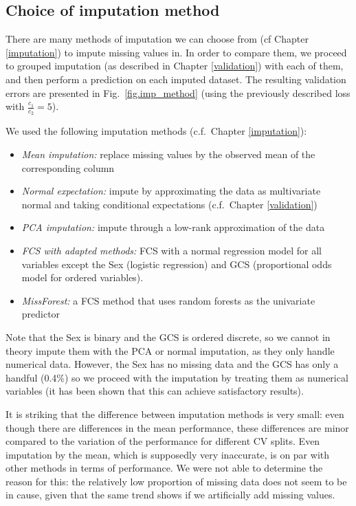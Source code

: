 		\subsection{Choice of imputation method}
		\label{choice.imp}
There are many methods of imputation we can choose from (cf Chapter \ref{imputation}) to impute missing values in. In order to compare them, we proceed to grouped imputation (as described in Chapter \ref{validation}) with each of them, and then perform a prediction on each imputed dataset. The resulting validation errors are presented in Fig.\ \ref{fig.imp_method} (using the previously described loss with $\frac{c_1}{c_2}=5$).

We used the following imputation methods (c.f.\ Chapter \ref{imputation}):
\begin{itemize}
\item \emph{Mean imputation:} replace missing values by the observed mean of the corresponding column
\item \emph{Normal expectation:} impute by approximating the data as multivariate normal and taking conditional expectations (c.f.\ Chapter \ref{validation})
\item \emph{PCA imputation:} impute through a low-rank approximation of the data
\item \emph{FCS with adapted methods:} FCS with a normal regression model for all variables except the Sex (logistic regression) and GCS (proportional odds model for ordered variables).
\item \emph{MissForest:} a FCS method that uses random forests \cite{svetnik2003RF} as the univariate predictor
\end{itemize}

Note that the Sex is binary and the GCS is ordered discrete, so we cannot in theory impute them with the PCA or normal imputation, as they only handle numerical data. However, the Sex has no missing data and the GCS has only a handful (0.4\%) so we proceed with the imputation by treating them as numerical variables (it has been shown \cite{bernaards2007robustness} that this can achieve satisfactory results).



It is striking that the difference between imputation methods is very small: even though there are differences in the mean performance, these differences are minor compared to the variation of the performance for different CV splits. Even imputation by the mean, which is supposedly very inaccurate, is on par with other methods in terms of performance. We were not able to determine the reason for this: the relatively low proportion of missing data does not seem to be in cause, given that the same trend shows if we artificially add missing values.

